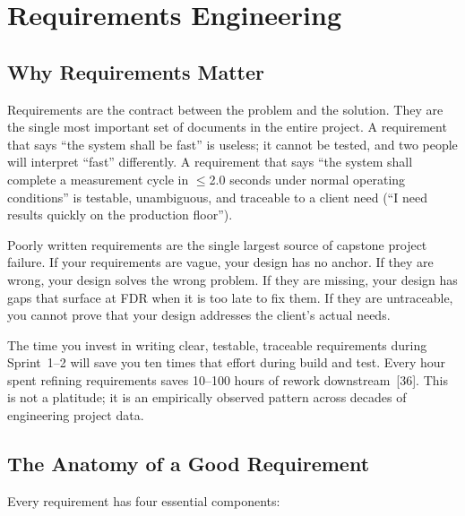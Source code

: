 \chapter{Requirements Engineering}

\section{Why Requirements Matter}
Requirements are the contract between the problem and the solution. They are the single most important set of documents in the entire project. A requirement that says ``the system shall be fast'' is useless; it cannot be tested, and two people will interpret ``fast'' differently. A requirement that says ``the system shall complete a measurement cycle in $\leq$2.0 seconds under normal operating conditions'' is testable, unambiguous, and traceable to a client need (``I need results quickly on the production floor'').

Poorly written requirements are the single largest source of capstone project failure. If your requirements are vague, your design has no anchor. If they are wrong, your design solves the wrong problem. If they are missing, your design has gaps that surface at FDR when it is too late to fix them. If they are untraceable, you cannot prove that your design addresses the client's actual needs.

The time you invest in writing clear, testable, traceable requirements during Sprint~1--2 will save you ten times that effort during build and test. Every hour spent refining requirements saves 10--100 hours of rework downstream~[36]. This is not a platitude; it is an empirically observed pattern across decades of engineering project data.

\section{The Anatomy of a Good Requirement}
Every requirement has four essential components:

